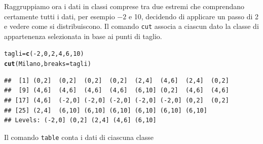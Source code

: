 \documentclass[onecolumn,12pt]{book}\usepackage[]{graphicx}\usepackage[]{color}
\makeatletter
\newcommand{\hlnum}[1]{\textcolor[rgb]{0.686,0.059,0.569}{#1}}%
\newcommand{\hlopt}[1]{\textcolor[rgb]{0,0,0}{#1}}%
\newcommand{\hlstd}[1]{\textcolor[rgb]{0.345,0.345,0.345}{#1}}%
\newcommand{\hlkwb}[1]{\textcolor[rgb]{0.69,0.353,0.396}{#1}}%
\newcommand{\hlkwc}[1]{\textcolor[rgb]{0.333,0.667,0.333}{#1}}%
\newcommand{\hlkwd}[1]{\textcolor[rgb]{0.737,0.353,0.396}{\textbf{#1}}}%
\newenvironment{kframe}{%
 \def\at@end@of@kframe{}%
 \ifinner\ifhmode%
  \def\at@end@of@kframe{\end{minipage}}%
  \begin{minipage}{\columnwidth}%
 \fi\fi%
 \def\FrameCommand##1{\hskip\@totalleftmargin \hskip-\fboxsep
 \colorbox{shadecolor}{##1}\hskip-\fboxsep
     \hskip-\linewidth \hskip-\@totalleftmargin \hskip\columnwidth}%
 \MakeFramed {\advance\hsize-\width
   \@totalleftmargin\z@ \linewidth\hsize
   \@setminipage}}%
 {\par\unskip\endMakeFramed%
 \at@end@of@kframe}
\newenvironment{knitrout}{}{} %
\makeatother
\begin{document}
Raggruppiamo ora i dati in classi comprese  tra due estremi che comprendano certamente tutti i dati, per esempio \ensuremath{-2} e 10, decidendo di applicare un passo di 2 e vedere come si distribuiscono. Il comando \texttt{cut} associa a ciascun dato la classe di appartenenza selezionata in base ai punti di taglio.

\begin{knitrout}
\color{fgcolor}\begin{kframe}
\begin{alltt}
\hlstd{tagli}\hlkwb{=}\hlkwd{c}\hlstd{(}\hlopt{-}\hlnum{2}\hlstd{,}\hlnum{0}\hlstd{,}\hlnum{2}\hlstd{,}\hlnum{4}\hlstd{,}\hlnum{6}\hlstd{,}\hlnum{10}\hlstd{)}
\hlkwd{cut}\hlstd{(Milano,}\hlkwc{breaks}\hlstd{=tagli)}
\end{alltt}
\begin{verbatim}
##  [1] (0,2]  (0,2]  (0,2]  (0,2]  (2,4]  (4,6]  (2,4]  (0,2] 
##  [9] (4,6]  (4,6]  (4,6]  (4,6]  (6,10] (0,2]  (4,6]  (4,6] 
## [17] (4,6]  (-2,0] (-2,0] (-2,0] (-2,0] (-2,0] (0,2]  (0,2] 
## [25] (2,4]  (6,10] (6,10] (6,10] (6,10] (6,10] (6,10]
## Levels: (-2,0] (0,2] (2,4] (4,6] (6,10]
\end{verbatim}
\end{kframe}
\end{knitrout}

Il comando \texttt{table} conta i dati di ciascuna classe
\end{document}
